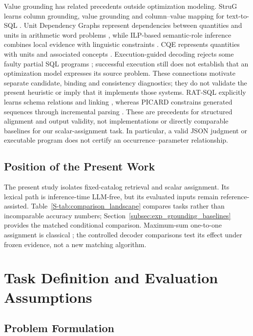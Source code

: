 \documentclass[pdflatex,sn-basic,Numbered]{sn-jnl}
\begin{document}
Value grounding has related precedents outside optimization modeling. StruG learns column grounding, value grounding and column--value mapping for text-to-SQL \cite{deng2021strug}. Unit Dependency Graphs represent dependencies between quantities and units in arithmetic word problems \cite{roy2017udg}, while ILP-based semantic-role inference combines local evidence with linguistic constraints \cite{punyakanok2004ilp}. CQE represents quantities with units and associated concepts \cite{almasian2023cqe}. Execution-guided decoding rejects some faulty partial SQL programs \cite{wang2018execution}; successful execution still does not establish that an optimization model expresses its source problem. These connections motivate separate candidate, binding and consistency diagnostics; they do not validate the present heuristic or imply that it implements those systems. RAT-SQL explicitly learns schema relations and linking \cite{wang2020ratsql}, whereas PICARD constrains generated sequences through incremental parsing \cite{scholak2021picard}. These are precedents for structured alignment and output validity, not implementations or directly comparable baselines for our scalar-assignment task. In particular, a valid JSON judgment or executable program does not certify an occurrence--parameter relationship.

\subsection{Position of the Present Work}
\label{subsec:rw_position}

The present study isolates fixed-catalog retrieval and scalar assignment. Its lexical path is inference-time LLM-free, but its evaluated inputs remain reference-assisted. Table~\ref{S-tab:comparison_landscape} compares tasks rather than incomparable accuracy numbers; Section~\ref{subsec:exp_grounding_baselines} provides the matched conditional comparison. Maximum-sum one-to-one assignment is classical \cite{kuhn1955assignment}; the controlled decoder comparisons test its effect under frozen evidence, not a new matching algorithm.



\section{Task Definition and Evaluation Assumptions}
\label{sec:task}
\subsection{Problem Formulation}
\label{subsec:method_problem}
\end{document}
